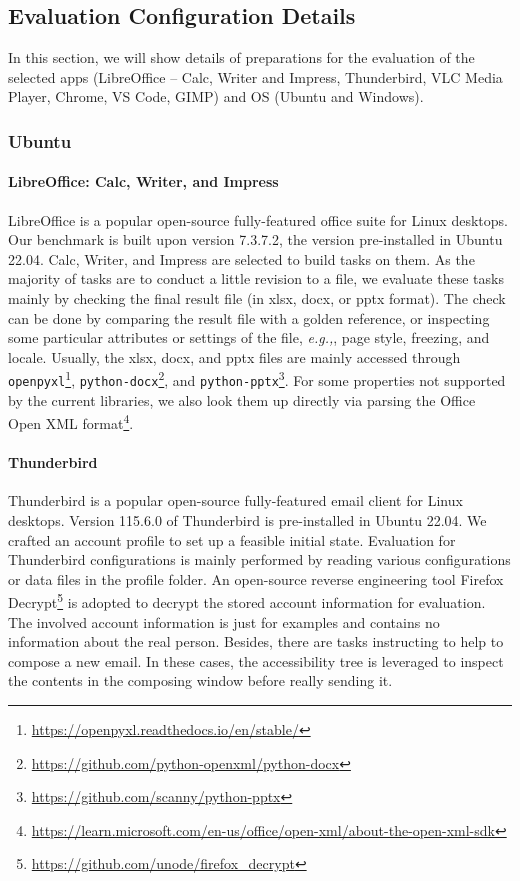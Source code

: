 \subsection{Evaluation Configuration Details}
\label{app:evaluation_configuration_details}
In this section, we will show details of preparations for the evaluation of the selected apps (LibreOffice -- Calc, Writer and Impress, Thunderbird, VLC Media Player, Chrome, VS Code, GIMP) and OS (Ubuntu and Windows).

\subsubsection{Ubuntu}

\paragraph{LibreOffice: Calc, Writer, and Impress}
LibreOffice is a popular open-source fully-featured office suite for Linux desktops. Our benchmark is built upon version 7.3.7.2, the 
version pre-installed in Ubuntu 22.04. Calc, Writer, and Impress are selected to build tasks on them. As the majority of tasks are to 
conduct a little revision to a file, we evaluate these tasks mainly by checking the final result file (in xlsx, docx, or pptx format).
The check can be done by comparing 
the result file with a golden reference, or inspecting some particular attributes or settings of the file, \textit{e.g.,}, page style,
freezing, and locale. Usually, the xlsx, docx, and pptx files are mainly accessed through 
\verb|openpyxl|\footnote{\url{https://openpyxl.readthedocs.io/en/stable/}},
\verb|python-docx|\footnote{\url{https://github.com/python-openxml/python-docx}}, and
\verb|python-pptx|\footnote{\url{https://github.com/scanny/python-pptx}}. For some properties not supported by the current libraries,
we also look them up directly via parsing the Office Open XML 
format\footnote{\url{https://learn.microsoft.com/en-us/office/open-xml/about-the-open-xml-sdk}}.

\paragraph{Thunderbird}
Thunderbird is a popular open-source fully-featured email client for Linux desktops. Version 115.6.0 of Thunderbird is pre-installed
in Ubuntu 22.04. We crafted an account profile to set up a feasible initial state. Evaluation for Thunderbird configurations
is mainly performed by reading various configurations or data files in the profile folder. An open-source reverse engineering
tool Firefox Decrypt\footnote{\url{https://github.com/unode/firefox_decrypt}} is adopted to decrypt the stored account 
information for evaluation. The involved account information is just for examples and contains no information about the real person.
Besides, there are tasks instructing to help to compose a new email. In these cases, the accessibility tree is leveraged to inspect 
the contents in the composing window before really sending it.


